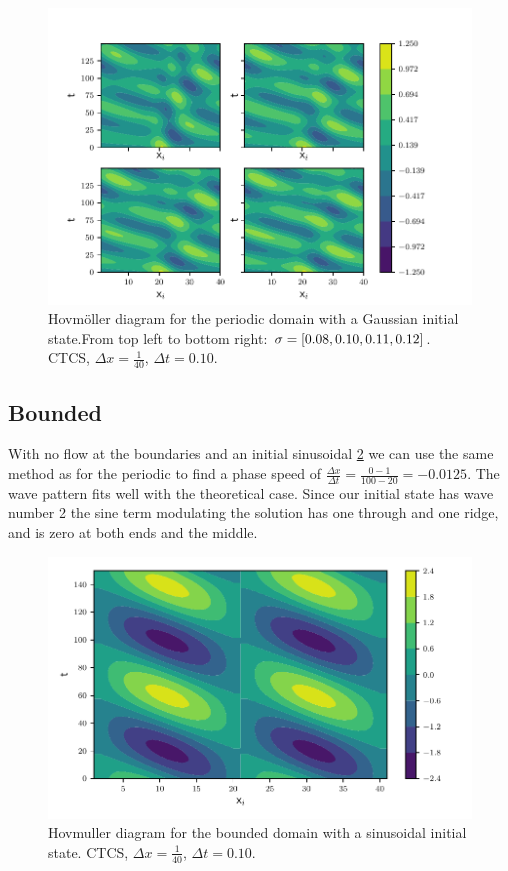 \begin{figure}[H]
  \centering
  \includegraphics[width=\textwidth]{../figures/hovmuller_sigma.pdf}
  \caption{Hovmöller diagram for the periodic domain with a Gaussian initial
  state.From top left to bottom right: $\sigma = \left[0.08, 0.10, 0.11, 0.12\right]$.
  CTCS, $\Delta x = \frac{1}{40}$, $\Delta t = 0.10$.
  }
  \label{fig:periodic_gauss}
\end{figure}



\subsection{Bounded}

With no flow at the boundaries and an initial sinusoidal \cref{fig:bounded_sine}
we can use the same method as for the periodic to find a phase speed of
$\frac{\Delta x}{\Delta t} = \frac{0 -1}{100 - 20} = -0.0125$.
The wave pattern fits well with the theoretical case. Since our initial state
has wave number 2 the sine term modulating the solution has one through and
one ridge, and is zero at both ends and the middle.


\begin{figure}[H]
  \centering
  \includegraphics[width=\textwidth]{../figures/psi_bounded_centered_sine.pdf}
  \caption{Hovmuller diagram for the bounded domain with a sinusoidal initial
  state. CTCS, $\Delta x = \frac{1}{40}$, $\Delta t = 0.10$.}
  \label{fig:bounded_sine}
\end{figure}


